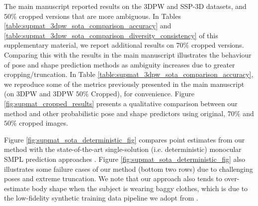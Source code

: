  The main manuscript reported results on the 3DPW \cite{vonMarcard2018} and SSP-3D \cite{STRAPS2020BMVC} datasets, and $50\%$ cropped versions that are more ambiguous. In Tables \ref{table:supmat_3dpw_sota_comparison_accuracy} and \ref{table:supmat_3dpw_sota_comparison_diversity_consistency} of this supplementary material, we report additional results on $70\%$ cropped versions. Comparing this with the results in the main manuscript illustrates the behaviour of pose and shape prediction methods as ambiguity increases due to greater cropping/truncation. In Table \ref{table:supmat_3dpw_sota_comparison_accuracy}, we reproduce some of the metrics previously presented in the main manuscript (on 3DPW and 3DPW $50\%$ Cropped), for convenience. Figure \ref{fig:supmat_cropped_results} presents a qualitative comparison between our method and other probabilistic pose and shape predictors using original, $70\%$ and $50\%$ cropped images.



 Figure \ref{fig:supmat_sota_deterministic_fig} compares point estimates from our method with the state-of-the-art single-solution (i.e. deterministic) monocular SMPL prediction approaches \cite{Kocabas_PARE_2021, li2020hybrik}. Figure \ref{fig:supmat_sota_deterministic_fig} also illustrates some failure cases of our method (bottom two rows) due to challenging poses and extreme truncation. We note that our approach also tends to over-estimate body shape when the subject is wearing baggy clothes, which is due to the low-fidelity synthetic training data pipeline we adopt from \cite{sengupta2021hierprobhuman}.




